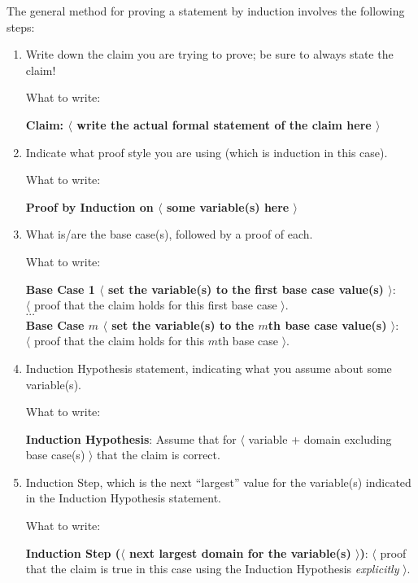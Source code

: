 The general method for proving a statement by induction involves the following steps:
\begin{enumerate}
	\item Write down the claim you are trying to prove; be sure to always state the claim!
	
	What to write: 
	\begin{mdframed}[align=center]
		\textbf{Claim: $\langle$ write the actual formal statement of the claim here $\rangle$}
	\end{mdframed}

	\item Indicate what proof style you are using (which is induction in this case).
	
	What to write: 
	\begin{mdframed}[align=center]
		\textbf{Proof by Induction on $\langle$ some variable(s) here $\rangle$}
	\end{mdframed}

	\item What is/are the base case(s), followed by a proof of each. 
	
	What to write: 
	\begin{mdframed}[align=center]
		\textbf{Base Case 1 $\langle$ set the variable(s) to the first base case value(s) $\rangle$}:\\ $\langle$ proof that the claim holds for this first base case $\rangle$.\\
		$\cdots$\\
		\textbf{Base Case $m$ $\langle$ set the variable(s) to the $m$th base case value(s) $\rangle$}: \\$\langle$ proof that the claim holds for this $m$th base case $\rangle$.
	\end{mdframed}
	
	\item Induction Hypothesis statement, indicating what you assume about some variable(s).
	
	What to write:
	\begin{mdframed}[align=center]
		\textbf{Induction Hypothesis}: Assume that for $\langle$ variable + domain excluding base case(s) $\rangle$ that the claim is correct.
	\end{mdframed}

	\item Induction Step, which is the next ``largest'' value for the variable(s) indicated in the Induction Hypothesis statement.
	
	What to write:
	\begin{mdframed}[align=center]
		\textbf{Induction Step ($\langle$ next largest domain for the variable(s) $\rangle$)}: $\langle$ proof that the claim is true in this case using the Induction Hypothesis \emph{explicitly} $\rangle$.
	\end{mdframed}


\end{enumerate}
